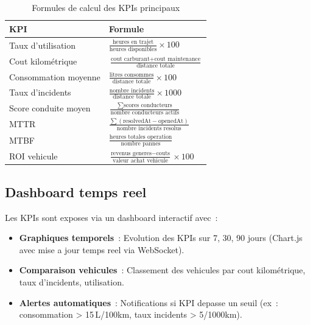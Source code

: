 \documentclass[12pt,a4paper]{report}
\begin{document}
\begin{enumerate}[leftmargin=2cm]
\begin{table}[H]
\caption{Formules de calcul des KPIs principaux}
\label{tab:formules_kpis}
\centering\small
\begin{tabularx}{\textwidth}{p{5cm}X}
\toprule
\textbf{KPI} & \textbf{Formule} \\
\midrule
Taux d'utilisation      & $\frac{\text{heures en trajet}}{\text{heures disponibles}} \times 100$ \\
Cout kilom\'etrique     & $\frac{\text{cout carburant} + \text{cout maintenance}}{\text{distance totale}}$ \\
Consommation moyenne    & $\frac{\text{litres consommes}}{\text{distance totale}} \times 100$ \\
Taux d'incidents        & $\frac{\text{nombre incidents}}{\text{distance totale}} \times 1000$ \\
Score conduite moyen    & $\frac{\sum \text{scores conducteurs}}{\text{nombre conducteurs actifs}}$ \\
MTTR                    & $\frac{\sum (\text{resolvedAt} - \text{openedAt})}{\text{nombre incidents resolus}}$ \\
MTBF                    & $\frac{\text{heures totales operation}}{\text{nombre pannes}}$ \\
ROI vehicule            & $\frac{\text{revenus generes} - \text{couts}}{\text{valeur achat vehicule}} \times 100$ \\
\bottomrule
\end{tabularx}
\end{table}

\subsection{Dashboard temps reel}

Les KPIs sont exposes via un dashboard interactif avec~:

\begin{itemize}[leftmargin=2cm]
  \item \textbf{Graphiques temporels}~: Evolution des KPIs sur 7, 30, 90 jours
        (Chart.js avec mise a jour temps reel via WebSocket).
        
  \item \textbf{Comparaison vehicules}~: Classement des vehicules par cout
        kilom\'etrique, taux d'incidents, utilisation.
        
  \item \textbf{Alertes automatiques}~: Notifications si KPI depasse un
        seuil (ex~: consommation > 15\,L/100km, taux incidents > 5/1000km).
        

\end{itemize}
\end{enumerate}
\end{document}
